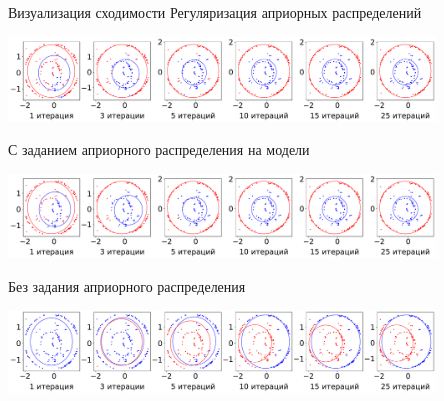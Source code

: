 \documentclass[10pt,pdf,hyperref={unicode}]{beamer}
\begin{document}
\begin{frame}{Визуализация сходимости}
\justifying
Регуляризация априорных распределений
\begin{center}
	\includegraphics[width=0.85\textwidth]{figures/experiment_real_regular}
\end{center}
С заданием априорного распределения на модели
\begin{center}
	\includegraphics[width=0.85\textwidth]{figures/experiment_real_prior}
\end{center}
Без задания априорного распределения
\begin{center}
	\includegraphics[width=0.85\textwidth]{figures/experiment_real_not_prior}
\end{center}
\end{frame}
\end{document}
